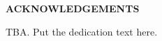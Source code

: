 \begin{centering}
\textbf{ACKNOWLEDGEMENTS}\\
\vspace{\baselineskip}
\end{centering}

TBA. Put the dedication text here.
